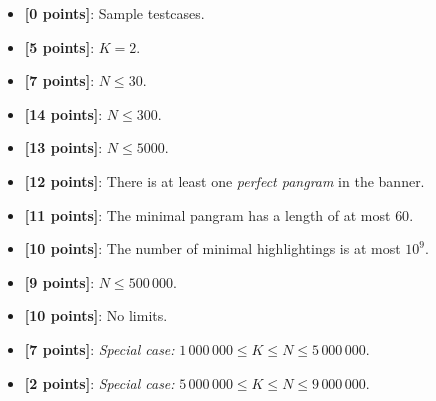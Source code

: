 \begin{itemize}[nolistsep,itemsep=2mm]
  \item \textbf{ [\phantom{1}0 points]}: Sample testcases.
  \item \textbf{ [\phantom{1}5 points]}: $K = 2$.
  \item \textbf{ [\phantom{1}7 points]}: $N \le 30$.
  \item \textbf{ [14           points]}: $N \le 300$.
  \item \textbf{ [13           points]}: $N \le 5000$.
  \item \textbf{ [12           points]}: There is at least one \textit{perfect pangram} in the banner.
  \item \textbf{ [11           points]}: The minimal pangram has a length of at most $60$.
  \item \textbf{ [10           points]}: The number of minimal highlightings is at most $10^9$.
  \item \textbf{ [\phantom{1}9 points]}: $N \le 500\,000$.
  \item \textbf{ [10           points]}: No limits.
  \item \textbf{ [\phantom{1}7 points]}: \emph{Special case:} $1\,000\,000 \le K \le N \le 5\,000\,000$.
  \item \textbf{ [\phantom{1}2 points]}: \emph{Special case:} $5\,000\,000 \le K \le N \le 9\,000\,000$.
\end{itemize}



\Examples

\begin{example}
%
%
%
%
\end{example}

